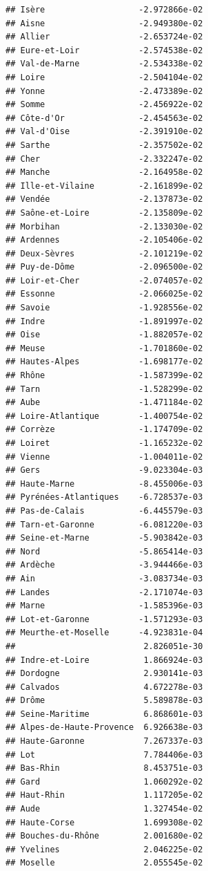 \documentclass[]{book}
\begin{document}
\begin{verbatim}
## Isère                   -2.972866e-02
## Aisne                   -2.949380e-02
## Allier                  -2.653724e-02
## Eure-et-Loir            -2.574538e-02
## Val-de-Marne            -2.534338e-02
## Loire                   -2.504104e-02
## Yonne                   -2.473389e-02
## Somme                   -2.456922e-02
## Côte-d'Or               -2.454563e-02
## Val-d'Oise              -2.391910e-02
## Sarthe                  -2.357502e-02
## Cher                    -2.332247e-02
## Manche                  -2.164958e-02
## Ille-et-Vilaine         -2.161899e-02
## Vendée                  -2.137873e-02
## Saône-et-Loire          -2.135809e-02
## Morbihan                -2.133030e-02
## Ardennes                -2.105406e-02
## Deux-Sèvres             -2.101219e-02
## Puy-de-Dôme             -2.096500e-02
## Loir-et-Cher            -2.074057e-02
## Essonne                 -2.066025e-02
## Savoie                  -1.928556e-02
## Indre                   -1.891997e-02
## Oise                    -1.882057e-02
## Meuse                   -1.701860e-02
## Hautes-Alpes            -1.698177e-02
## Rhône                   -1.587399e-02
## Tarn                    -1.528299e-02
## Aube                    -1.471184e-02
## Loire-Atlantique        -1.400754e-02
## Corrèze                 -1.174709e-02
## Loiret                  -1.165232e-02
## Vienne                  -1.004011e-02
## Gers                    -9.023304e-03
## Haute-Marne             -8.455006e-03
## Pyrénées-Atlantiques    -6.728537e-03
## Pas-de-Calais           -6.445579e-03
## Tarn-et-Garonne         -6.081220e-03
## Seine-et-Marne          -5.903842e-03
## Nord                    -5.865414e-03
## Ardèche                 -3.944466e-03
## Ain                     -3.083734e-03
## Landes                  -2.171074e-03
## Marne                   -1.585396e-03
## Lot-et-Garonne          -1.571293e-03
## Meurthe-et-Moselle      -4.923831e-04
##                          2.826051e-30
## Indre-et-Loire           1.866924e-03
## Dordogne                 2.930141e-03
## Calvados                 4.672278e-03
## Drôme                    5.589878e-03
## Seine-Maritime           6.868601e-03
## Alpes-de-Haute-Provence  6.926638e-03
## Haute-Garonne            7.267337e-03
## Lot                      7.784406e-03
## Bas-Rhin                 8.453751e-03
## Gard                     1.060292e-02
## Haut-Rhin                1.117205e-02
## Aude                     1.327454e-02
## Haute-Corse              1.699308e-02
## Bouches-du-Rhône         2.001680e-02
## Yvelines                 2.046225e-02
## Moselle                  2.055545e-02

\end{verbatim}
\end{document}
